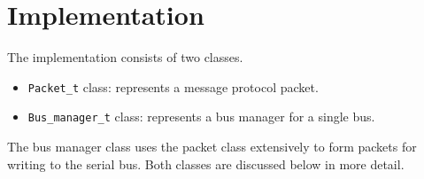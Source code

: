 

\chapter{Implementation}
The implementation consists of two classes.
\begin{itemize}
	\item \texttt{Packet\_t} class: represents a message protocol packet.
	\item \texttt{Bus\_manager\_t} class: represents a bus manager for a single bus.
\end{itemize}
The bus manager class uses the packet class extensively to form packets for writing to the serial bus. Both classes are discussed below in more detail.

